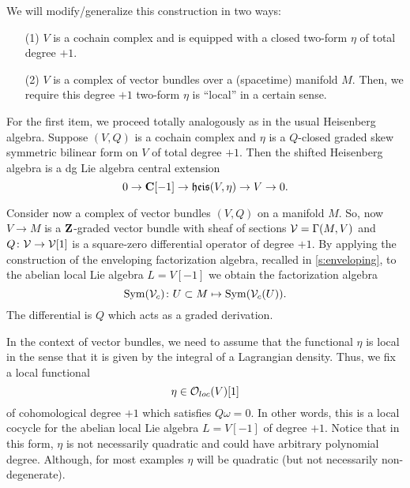 \documentclass[11pt]{amsart}
\begin{document}
We will modify/generalize this construction in two ways:
\begin{itemize}
  \item[(1)] $V$ is a cochain complex and is equipped with a closed two-form $\eta$ of total degree $+1$.
  \item[(2)] $V$ is a complex of vector bundles over a (spacetime) manifold $M$. Then, we require this degree $+1$ two-form $\eta$ is ``local'' in a certain sense.
\end{itemize}

For the first item, we proceed totally analogously as in the usual Heisenberg algebra.
Suppose $(V,Q)$ is a cochain complex and $\eta$ is a $Q$-closed graded skew symmetric bilinear form on $V$ of total degree $+1$.
Then the shifted Heisenberg algebra is a dg Lie algebra central extension
\begin{equation}\label{eqn:shifted}
0 \to \mathbf{C}[-1] \to \mathfrak{heis}(V,\eta) \to V \to 0 .
\end{equation}

Consider now a complex of vector bundles $(V,Q)$ on a manifold $M$.
So, now $V \to M$ is a $\mathbf{Z}$-graded vector bundle with sheaf of sections $\mathcal V = \Gamma(M,V)$ and $Q \colon \mathcal V \to \mathcal V[1]$ is a square-zero differential operator of degree $+1$.
By applying the construction of the enveloping factorization algebra, recalled in \ref{s:enveloping}, to the abelian local Lie algebra $L = V[-1]$ we obtain the factorization algebra
\begin{equation}
\operatorname{Sym}(\mathcal V_c) \colon U \subset M \mapsto \operatorname{Sym}(\mathcal V_c(U)) .
\end{equation}
The differential is $Q$ which acts as a graded derivation.

In the context of vector bundles, we need to assume that the functional $\eta$ is local in the sense that it is given by the integral of a Lagrangian density.
Thus, we fix a local functional
\begin{equation}
\eta \in {\mathcal O}_{loc}(V)[1]
\end{equation}
of cohomological degree $+1$ which satisfies $Q \omega = 0$.
In other words, this is a local cocycle for the abelian local Lie algebra $L = V[-1]$ of degree $+1$.
Notice that in this form, $\eta$ is not necessarily quadratic and could have arbitrary polynomial degree.
Although, for most examples $\eta$ will be quadratic (but not necessarily non-degenerate).
\end{document}
